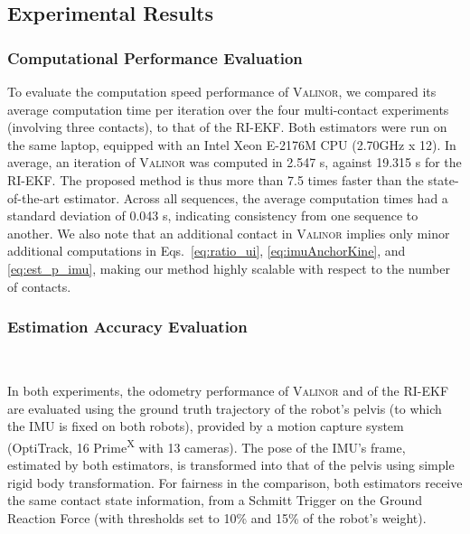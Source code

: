 \documentclass{IJCAS}
\begin{document}
\subsection{Experimental Results}

\subsubsection{Computational Performance Evaluation}\label{subsec:computation_time}

To evaluate the computation speed performance of {\scshape Valinor}, we compared its average computation time per iteration over the four multi-contact experiments (involving three contacts), to that of the RI-EKF. Both estimators were run on the same laptop, equipped with an Intel Xeon E-2176M CPU (2.70GHz x 12). In average, an iteration of {\scshape Valinor} was computed in 2.547 \textmu s, against 19.315 \textmu s for the RI-EKF. The proposed method is thus more than 7.5 times faster than the state-of-the-art estimator. Across all sequences, the average computation times had a standard deviation of 0.043 \textmu s, indicating consistency from one sequence to another. We also note that an additional contact in {\scshape Valinor} implies only minor additional computations in Eqs.~\eqref{eq:ratio_ui}, \eqref{eq:imuAnchorKine}, and \eqref{eq:est_p_imu}, making our method highly scalable with respect to the number of contacts.


\subsubsection{Estimation Accuracy Evaluation} ~\label{subsec:est_accur_eval}


In both experiments, the odometry performance of {\scshape Valinor} and of the RI-EKF are evaluated using the ground truth trajectory of the robot's pelvis (to which the IMU is fixed on both robots), provided by a motion capture system (OptiTrack, 16 Prime\textsuperscript{X} with 13 cameras). The pose of the IMU's frame, estimated by both estimators, is transformed into that of the pelvis using simple rigid body transformation. For fairness in the comparison, both estimators receive the same contact state information, from a Schmitt Trigger on the Ground Reaction Force (with thresholds set to 10\% and 15\% of the robot's weight).
\end{document}
